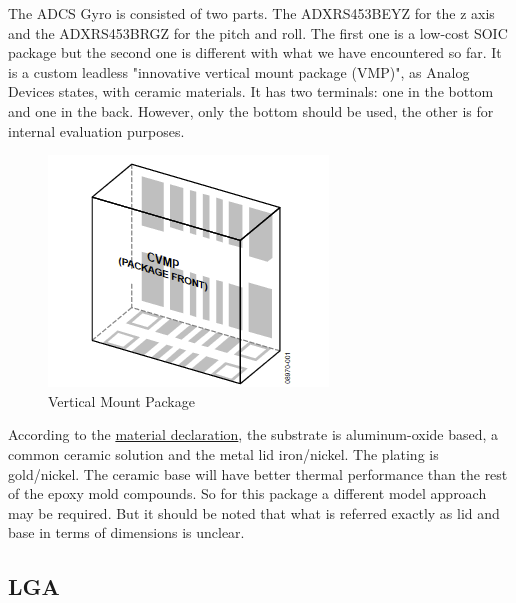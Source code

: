 \documentclass[final]{cubedoc}
\begin{document}
	The ADCS Gyro is consisted of two parts. The ADXRS453BEYZ for the z axis and the ADXRS453BRGZ for the pitch and roll. The first one is a low-cost SOIC package but the second one is different with what we have encountered so far. It is a custom leadless "innovative vertical mount package (VMP)", as Analog Devices states, with ceramic materials. It has two terminals: one in the bottom and one in the back. However, only the bottom should be used, the other is for internal evaluation purposes. 
	
	\begin{figure}[h!]
		\centering
		\includegraphics[keepaspectratio, height=.3\textheight, width=\textwidth]{docs/vmp.png}
		\caption{Vertical Mount Package}
		\label{fig:my_label}
	\end{figure}
	
	According to the \href{https://web.archive.org/web/20200818133905/https://www.analog.com/media/en/package-pcb-resources/material-declaration/lcc/LCC_V_14L(ey-14-1).PDF}{material declaration}, the substrate is aluminum-oxide based, a common ceramic solution and the metal lid iron/nickel. The plating is gold/nickel. The ceramic base will have better thermal performance than the rest of the epoxy mold compounds. So for this package a different model approach may be required. But it should be noted that what is referred exactly as lid and base in terms of dimensions is unclear. 
	
	\subsection{LGA}
	
\end{document}
